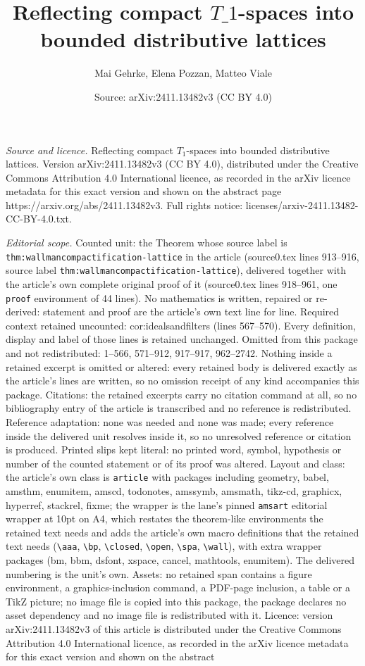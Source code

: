 \documentclass[10pt,a4paper]{amsart}
\title[Reflecting compact $T\_1$-spaces into bounded distributive la]{Reflecting compact $T\_1$-spaces into bounded distributive lattices}
\author{Mai Gehrke, Elena Pozzan, Matteo Viale}
\date{Source: arXiv:2411.13482v3 (CC BY 4.0)}
\begin{document}
\maketitle

\noindent\emph{Source and licence.} Reflecting compact $T_1$-spaces into bounded distributive lattices. Version arXiv:2411.13482v3 (CC BY 4.0), distributed under the Creative Commons Attribution 4.0 International licence, as recorded in the arXiv licence metadata for this exact version and shown on the abstract page https://arxiv.org/abs/2411.13482v3. Full rights notice: licenses/arxiv-2411.13482-CC-BY-4.0.txt.\par\smallskip

\noindent\textit{Editorial scope.} Counted unit: the Theorem whose source label is \texttt{thm:wallmancompactification-lattice} in the article (source0.tex lines 913--916, source label \texttt{thm:wallmancompactification-lattice}), delivered together with the article's own complete original proof of it (source0.tex lines 918--961, one \texttt{proof} environment of 44 lines). No mathematics is written, repaired or re-derived: statement and proof are the article's own text line for line. Required context retained uncounted: cor:idealsandfilters (lines 567--570). Every definition, display and label of those lines is retained unchanged. Omitted from this package and not redistributed: 1--566, 571--912, 917--917, 962--2742. Nothing inside a retained excerpt is omitted or altered: every retained body is delivered exactly as the article's lines are written, so no omission receipt of any kind accompanies this package. Citations: the retained excerpts carry no citation command at all, so no bibliography entry of the article is transcribed and no reference is redistributed. Reference adaptation: none was needed and none was made; every reference inside the delivered unit resolves inside it, so no unresolved reference or citation is produced. Printed slips kept literal: no printed word, symbol, hypothesis or number of the counted statement or of its proof was altered. Layout and class: the article's own class is \texttt{article} with packages including geometry, babel, amsthm, enumitem, amscd, todonotes, amssymb, amsmath, tikz-cd, graphicx, hyperref, stackrel, fixme; the wrapper is the lane's pinned \texttt{amsart} editorial wrapper at 10pt on A4, which restates the theorem-like environments the retained text needs and adds the article's own macro definitions that the retained text needs (\texttt{\textbackslash aaa}, \texttt{\textbackslash bp}, \texttt{\textbackslash closed}, \texttt{\textbackslash open}, \texttt{\textbackslash spa}, \texttt{\textbackslash wall}), with extra wrapper packages (bm, bbm, dsfont, xspace, cancel, mathtools, enumitem). The delivered numbering is the unit's own. Assets: no retained span contains a figure environment, a graphics-inclusion command, a PDF-page inclusion, a table or a TikZ picture; no image file is copied into this package, the package declares no asset dependency and no image file is redistributed with it. Licence: version arXiv:2411.13482v3 of this article is distributed under the Creative Commons Attribution 4.0 International licence, as recorded in the arXiv licence metadata for this exact version and shown on the abstract 
\end{document}
